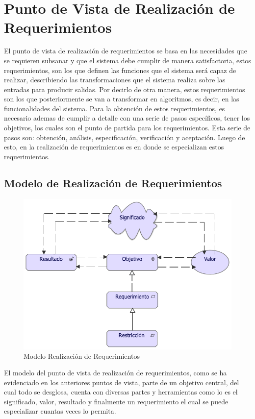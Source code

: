 \section{Punto de Vista de Realización de Requerimientos}
El punto de vista de realización de requerimientos se basa en las necesidades que se requieren subsanar y que el sistema debe cumplir de manera satisfactoria, estos requerimientos, son los que definen las funciones que el sistema será capaz de realizar, describiendo las transformaciones que el sistema realiza sobre las entradas para producir salidas. Por decirlo de otra manera, estos requerimientos son los que posteriormente se van a transformar en algoritmos, es decir, en las funcionalidades del sistema.
Para la obtención de estos requerimientos, es necesario ademas de cumplir a detalle con una serie de pasos específicos, tener los objetivos, los cuales son el punto de partida para los requerimientos. Esta serie de pasos son: obtención, análisis, especificación, verificación y aceptación. Luego de esto, en la realización de requerimientos es en donde se especializan estos requerimientos.


\subsection{Modelo de Realización de Requerimientos}
\begin{figure}[h!]
	\centering
	\includegraphics[width=1.0\linewidth]{imgs/modelo/RealRequerimientos}
	\caption{Modelo Realización de Requerimientos}
\end{figure}

El modelo del punto de vista de realización de requerimientos, como se ha evidenciado en los anteriores puntos de vista, parte de un objetivo central, del cual todo se desglosa, cuenta con diversas partes y herramientas como lo es el significado, valor, resultado y finalmente un requerimiento el cual se puede especializar cuantas veces lo permita.

